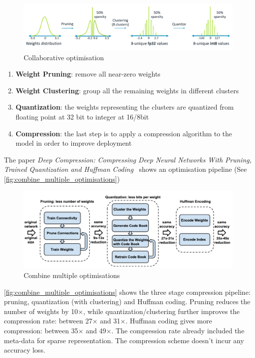 \begin{figure}[ht]
    \includegraphics[width=\textwidth]{images/introduction/collaborative_optimisation.png}
    \centering
    \caption{Collaborative optimisation}\label{fig:collaborative_optimisation}
\end{figure}

\begin{enumerate}
    \item \textbf{Weight Pruning}: remove all near-zero weights
    \item \textbf{Weight Clustering}: group all the remaining weights in
        different clusters
    \item \textbf{Quantization}: the weights representing the clusters are
        quantized from floating point at 32 bit to integer at 16/8bit
    \item \textbf{Compression}: the last step is to apply a compression
        algorithm to the model in order to improve deployment
\end{enumerate}

The paper \textit{Deep Compression: Compressing Deep Neural Networks With
Pruning, Trained Quantization and Huffman Coding}~\cite{han2015deep} shows an
optimisation pipeline (See \autoref{fig:combine_multiple_optimisations})

\begin{figure}[ht]
    \includegraphics[width=\textwidth]{images/introduction/combine_multiple_optimisations.png}
    \centering
    \caption{Combine multiple optimisations}\label{fig:combine_multiple_optimisations}
\end{figure}

\autoref{fig:combine_multiple_optimisations} shows the three stage compression
pipeline: pruning, quantization (with clustering) and Huffman coding. Pruning
reduces the number of weights by 10×, while quantization/clustering further
improves the compression rate: between 27× and 31×. Huffman coding gives more
compression: between 35× and 49×. The compression rate already included the
meta-data for sparse representation. The compression scheme doesn't incur any
accuracy loss.
